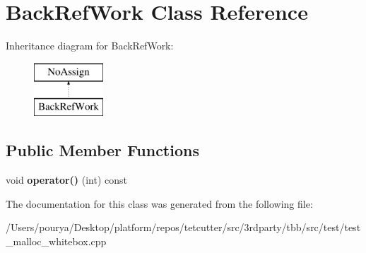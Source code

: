 \hypertarget{classBackRefWork}{}\section{Back\+Ref\+Work Class Reference}
\label{classBackRefWork}
Inheritance diagram for Back\+Ref\+Work\+:\begin{figure}[H]
\begin{center}
\leavevmode
\includegraphics[height=2.000000cm]{classBackRefWork}
\end{center}
\end{figure}
\subsection*{Public Member Functions}
\begin{DoxyCompactItemize}
\item 
\hypertarget{classBackRefWork_a8ba4400650113a7bae7b9f31958c85a4}{}void {\bfseries operator()} (int) const \label{classBackRefWork_a8ba4400650113a7bae7b9f31958c85a4}

\end{DoxyCompactItemize}


The documentation for this class was generated from the following file\+:\begin{DoxyCompactItemize}
\item 
/\+Users/pourya/\+Desktop/platform/repos/tetcutter/src/3rdparty/tbb/src/test/test\+\_\+malloc\+\_\+whitebox.\+cpp\end{DoxyCompactItemize}
